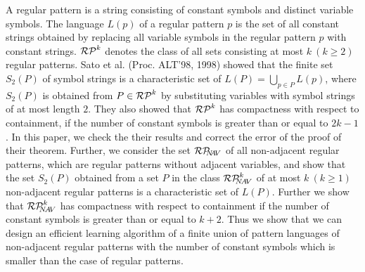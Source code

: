 \begin{summary}
A regular pattern is a string consisting of constant symbols and distinct variable symbols.
The language $L(p)$ of a regular pattern $p$ is the set of all constant strings obtained by replacing all variable symbols in the regular pattern $p$ with constant strings.
$\mathcal{RP}^{k}$ denotes the class of all sets consisting at most $k~(k\geq 2)$ regular patterns.
Sato et al. (Proc. ALT'98, 1998) showed that the finite set $S_2(P)$ of symbol strings is a characteristic set of $L(P)=\bigcup_{p\in P}L(p)$, where $S_2(P)$ is obtained from $P\in \mathcal{RP}^{k}$ by substituting variables with symbol strings of at most length $2$. 
They also showed that $\mathcal{RP}^{k}$  has compactness with respect to containment, if the number of constant symbols is greater than or equal to $2k-1$.
In this paper, we check the their results and correct the error of the proof of their theorem.
Further, we consider the set $\mathcal{RP}_{\!\!\!N\!\!A\!V}$ of all non-adjacent regular patterns, which are regular patterns without adjacent variables, and show that the set $S_2(P)$ obtained from a set $P$ in the class $\mathcal{RP}^{k}_{\!\!\!N\!A\!V}$ of at most $k~(k\ge 1)$ non-adjacent regular patterns is a characteristic set of $L(P)$.
Further we show that $\mathcal{RP}^{k}_{\!\!\!N\!A\!V}$  has compactness with respect to containment if the number of constant symbols is greater than or equal to $k+2$.
Thus we show that we can design an efficient learning algorithm of a finite union of pattern languages of non-adjacent regular patterns with the number of constant symbols which is smaller than the case of regular patterns.
\end{summary}
